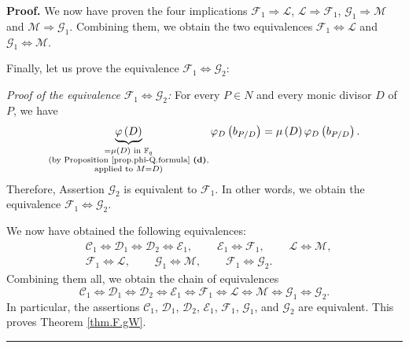 \documentclass[numbers=enddot,12pt,final,onecolumn,notitlepage]{scrartcl}%
\theoremstyle{definition}
\newenvironment{proof}[1][Proof]{\noindent\textbf{#1.} }{\ \rule{0.5em}{0.5em}}
\begin{document}
\begin{proof}
We now have proven the four implications $\mathcal{F}_{1}\Longrightarrow
\mathcal{L}$, $\mathcal{L}\Longrightarrow\mathcal{F}_{1}$, $\mathcal{G}%
_{1}\Longrightarrow\mathcal{M}$ and $\mathcal{M}\Longrightarrow\mathcal{G}%
_{1}$. Combining them, we obtain the two equivalences $\mathcal{F}%
_{1}\Longleftrightarrow\mathcal{L}$ and $\mathcal{G}_{1}\Longleftrightarrow
\mathcal{M}$.

Finally, let us prove the equivalence $\mathcal{F}_{1}\Longleftrightarrow
\mathcal{G}_{2}$:

\textit{Proof of the equivalence }$\mathcal{F}_{1}\Longleftrightarrow
\mathcal{G}_{2}$\textit{:} For every $P\in N$ and every monic divisor $D$ of
$P$, we have
\[
\underbrace{\varphi\left(  D\right)  }_{\substack{=\mu\left(  D\right)  \text{
in }\mathbb{F}_{q}\\\text{(by Proposition \ref{prop.phi-Q.formula}
\textbf{(d)},}\\\text{applied to }M=D\text{)}}}\varphi_{D}\left(
b_{P/D}\right)  =\mu\left(  D\right)  \varphi_{D}\left(  b_{P/D}\right)  .
\]
Therefore, Assertion $\mathcal{G}_{2}$ is equivalent to $\mathcal{F}_{1}$. In
other words, we obtain the equivalence $\mathcal{F}_{1}\Longleftrightarrow
\mathcal{G}_{2}$.

We now have obtained the following equivalences:%
\begin{align*}
&  \mathcal{C}_{1}\Longleftrightarrow\mathcal{D}_{1}\Longleftrightarrow
\mathcal{D}_{2}\Longleftrightarrow\mathcal{E}_{1}%
,\ \ \ \ \ \ \ \ \ \ \mathcal{E}_{1}\Longleftrightarrow\mathcal{F}%
_{1},\ \ \ \ \ \ \ \ \ \ \mathcal{L}\Longleftrightarrow\mathcal{M},\\
&  \mathcal{F}_{1}\Longleftrightarrow\mathcal{L}%
,\ \ \ \ \ \ \ \ \ \ \mathcal{G}_{1}\Longleftrightarrow\mathcal{M}%
,\ \ \ \ \ \ \ \ \ \ \mathcal{F}_{1}\Longleftrightarrow\mathcal{G}_{2}.
\end{align*}
Combining them all, we obtain the chain of equivalences%
\[
\mathcal{C}_{1}\Longleftrightarrow\mathcal{D}_{1}\Longleftrightarrow
\mathcal{D}_{2}\Longleftrightarrow\mathcal{E}_{1}\Longleftrightarrow
\mathcal{F}_{1}\Longleftrightarrow\mathcal{L}\Longleftrightarrow
\mathcal{M}\Longleftrightarrow\mathcal{G}_{1}\Longleftrightarrow
\mathcal{G}_{2}.
\]
In particular, the assertions $\mathcal{C}_{1}$, $\mathcal{D}_{1}$,
$\mathcal{D}_{2}$, $\mathcal{E}_{1}$, $\mathcal{F}_{1}$, $\mathcal{G}_{1}$,
and $\mathcal{G}_{2}$ are equivalent. This proves Theorem \ref{thm.F.gW}.
\end{proof}
\end{document}
